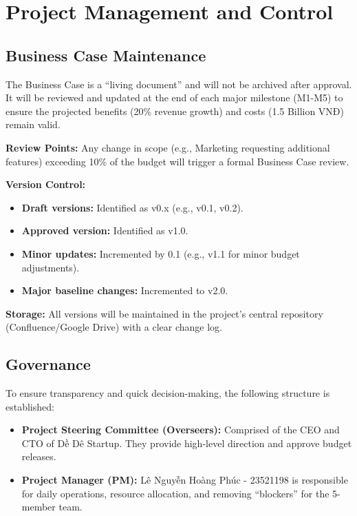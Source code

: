 \chapter{Project Management and Control}

\section{Business Case Maintenance}

The Business Case is a ``living document'' and will not be archived after approval. It will be reviewed and updated at the end of each major milestone (M1-M5) to ensure the projected benefits (20\% revenue growth) and costs (1.5 Billion VNĐ) remain valid.

\textbf{Review Points:} Any change in scope (e.g., Marketing requesting additional features) exceeding 10\% of the budget will trigger a formal Business Case review.

\textbf{Version Control:}
\begin{itemize}
    \item \textbf{Draft versions:} Identified as v0.x (e.g., v0.1, v0.2).
    \item \textbf{Approved version:} Identified as v1.0.
    \item \textbf{Minor updates:} Incremented by 0.1 (e.g., v1.1 for minor budget adjustments).
    \item \textbf{Major baseline changes:} Incremented to v2.0.
\end{itemize}

\textbf{Storage:} All versions will be maintained in the project's central repository (Confluence/Google Drive) with a clear change log.

\section{Governance}

To ensure transparency and quick decision-making, the following structure is established:
\begin{itemize}
    \item \textbf{Project Steering Committee (Overseers):} Comprised of the CEO and CTO of Dề Dê Startup. They provide high-level direction and approve budget releases.
    \item \textbf{Project Manager (PM):} Lê Nguyễn Hoàng Phúc - 23521198 is responsible for daily operations, resource allocation, and removing ``blockers'' for the 5-member team.
\end{itemize}

